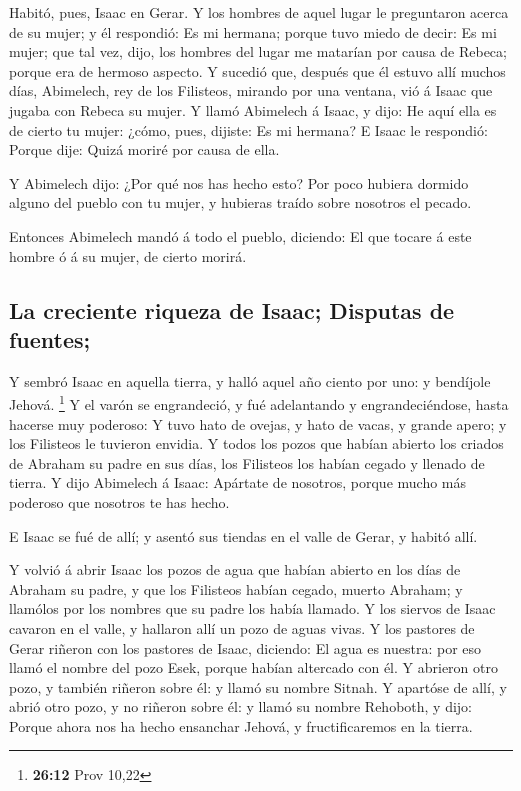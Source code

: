  Habitó, pues, Isaac en Gerar.  Y los hombres de
aquel lugar le preguntaron acerca de su mujer; y él respondió: Es mi
hermana; porque tuvo miedo de decir: Es mi mujer; que tal vez, dijo, los
hombres del lugar me matarían por causa de Rebeca; porque era de hermoso
aspecto.  Y sucedió que, después que él estuvo allí muchos
días, Abimelech, rey de los Filisteos, mirando por una ventana, vió á
Isaac que jugaba con Rebeca su mujer.  Y llamó Abimelech á
Isaac, y dijo: He aquí ella es de cierto tu mujer: ¿cómo, pues, dijiste:
Es mi hermana? E Isaac le respondió: Porque dije: Quizá moriré por causa
de ella.

 Y Abimelech dijo: ¿Por qué nos has hecho esto? Por poco
hubiera dormido alguno del pueblo con tu mujer, y hubieras traído sobre
nosotros el pecado.

 Entonces Abimelech mandó á todo el pueblo, diciendo: El
que tocare á este hombre ó á su mujer, de cierto morirá.

\hypertarget{la-creciente-riqueza-de-isaac-disputas-de-fuentes}{%
\subsection{La creciente riqueza de Isaac; Disputas de
fuentes;}\label{la-creciente-riqueza-de-isaac-disputas-de-fuentes}}

 Y sembró Isaac en aquella tierra, y halló aquel año ciento
por uno: y bendíjole Jehová. \footnote{\textbf{26:12} Prov 10,22}
 Y el varón se engrandeció, y fué adelantando y
engrandeciéndose, hasta hacerse muy poderoso:  Y tuvo hato
de ovejas, y hato de vacas, y grande apero; y los Filisteos le tuvieron
envidia.  Y todos los pozos que habían abierto los criados
de Abraham su padre en sus días, los Filisteos los habían cegado y
llenado de tierra.  Y dijo Abimelech á Isaac: Apártate de
nosotros, porque mucho más poderoso que nosotros te has hecho.

 E Isaac se fué de allí; y asentó sus tiendas en el valle
de Gerar, y habitó allí.

 Y volvió á abrir Isaac los pozos de agua que habían
abierto en los días de Abraham su padre, y que los Filisteos habían
cegado, muerto Abraham; y llamólos por los nombres que su padre los
había llamado.  Y los siervos de Isaac cavaron en el valle,
y hallaron allí un pozo de aguas vivas.  Y los pastores de
Gerar riñeron con los pastores de Isaac, diciendo: El agua es nuestra:
por eso llamó el nombre del pozo Esek, porque habían altercado con él.
 Y abrieron otro pozo, y también riñeron sobre él: y llamó
su nombre Sitnah.  Y apartóse de allí, y abrió otro pozo, y
no riñeron sobre él: y llamó su nombre Rehoboth, y dijo: Porque ahora
nos ha hecho ensanchar Jehová, y fructificaremos en la tierra.

